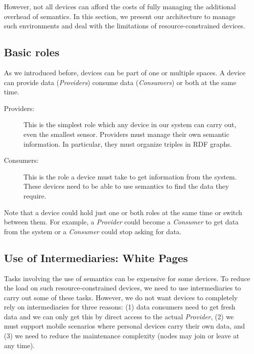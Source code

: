 However, not all devices can afford the costs of fully managing the additional overhead of semantics.
In this section, we present our architecture to manage such environments and deal with the limitations of resource-constrained devices.

\subsection{Basic roles}
As we introduced before, devices can be part of one or multiple spaces.
A device can provide data (\emph{Providers}) consume data (\emph{Consumers}) or both at the same time.

\begin{description}
\item[Providers:]
This is the simplest role which any device in our system can carry out, even the smallest sensor.
Providers must manage their own semantic information.
In particular, they must organize triples in RDF graphs.
\item[Consumers:]
This is the role a device must take to get information from the system.
These devices need to be able to use semantics to find the data they require.
\end{description}

Note that a device could hold just one or both roles at the same time or switch between them.
For example, a \emph{Provider} could become a \emph{Consumer} to get data from the system or a \emph{Consumer} could stop asking for data.


\subsection{Use of Intermediaries: White Pages}
Tasks involving the use of semantics can be expensive for some devices.
To reduce the load on such resource-constrained devices, we need to use intermediaries to carry out some of these tasks.
However, we do not want devices to completely rely on intermediaries for three reasons:
(1) data consumers need to get fresh data and we can only get this by direct access to the actual \emph{Provider},
(2) we must support mobile scenarios where personal devices carry their own data,
and (3) we need to reduce the maintenance complexity (nodes may join or leave at any time).

